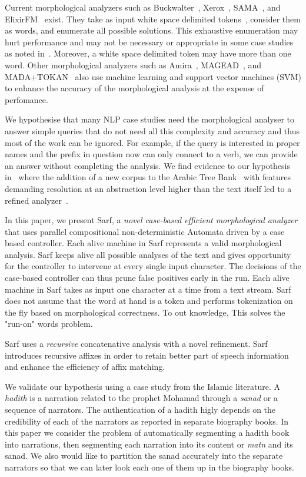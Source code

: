 \documentclass[11pt,letterpaper]{article}
\begin{document}
Current morphological analyzers such as 
Buckwalter~,
Xerox~\cite{Beesley:01}, SAMA~\cite{Kulick:10},
and ElixirFM~\cite{Otakar:07} exist.
They take as input white space delimited tokens~\cite{Kulick:10},
consider them as words,
and enumerate all possible solutions. 
This exhaustive enumeration may hurt performance and may
not be necessary or appropriate
in some case studies as noted in~\cite{Maamouri:10}. 
Moreover, a white space delimited token may have 
more than one word.
Other morphological analyzers such as Amira~\cite{Diab:07,Benajiba:07},
MAGEAD~\cite{Habash:05}, and MADA+TOKAN~\cite{Habash:09} 
also use machine learning and support vector machines (SVM) 
to enhance the accuracy of the morphological analysis at the expense 
of perfomance.

We hypothesise that many NLP case studies need the 
morphological analyser to answer simple queries that do not need 
all this complexity and accuracy and thus most of the work can be ignored. 
For example, if the query is interested in proper names and the 
prefix in question now can only connect to a verb, we can provide an answer
without completing the analysis. 
We find evidence to our hypothesis in~\cite{Maamouri:10} where the 
addition of a new corpus to the Arabic Tree Bank~\cite{Maamouri:04}
with features demanding resolution at an abstraction level
higher than the text itself
led to a refined analyzer~\cite{Kulick:10}.  

In this paper, we present Sarf, a {\em novel case-based efficient morphological 
analyzer} that uses parallel compositional non-deterministic Automata 
driven by a case based controller.
Each alive machine in Sarf represents a valid morphological analysis. 
Sarf keeps alive all possible analyses of the text and gives opportunity for the 
controller to intervene at every single input character. 
The decisions of the case-based controller can thus prune false positives early 
in the run. 
Each alive machine in Sarf takes as input one character at a time 
from a text stream. Sarf does not assume that the word at hand is a token and
performs tokenization on the fly based on morphological correctness.
To out knowledge, This solves the "run-on" words problem. 

Sarf uses a {\em recursive} concatenative analysis with a novel 
refinement. 
Sarf introduces recursive affixes in order to
retain better part of speech information and enhance the 
efficiency of affix matching. 

We validate our hypothesis using a case study from the Islamic 
literature. 
A {\em hadith} is a narration related to the prophet Mohamad
through a {\em sanad} or a sequence of narrators. 
The authentication of a hadith higly depends on the credibility
of each of the narrators as reported in separate biography 
books. 
In this paper we consider the problem of automatically segmenting
a hadith book into narrations, then segmenting each narration into
its content or {\em matn} and its sanad.
We also would like to partition the sanad accurately into the 
separate narrators so that we can later look each one of them 
up in the biography books. 
\end{document}
